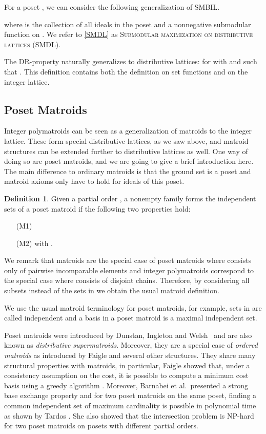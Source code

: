 \documentclass{article}
\theoremstyle{plain}
\theoremstyle{definition}
\newtheorem{defn}[theorem]{Definition}
\begin{document}
For a poset , we can consider the following generalization of SMBIL.
 
 where
  is the collection of all ideals in the poset  and  a nonnegative submodular function on .
 We refer to \eqref{SMDL} as \textsc{Submodular maximization on distributive lattices (SMDL)}.



The DR-property naturally generalizes to distributive lattices: 
 for  with  and  such that . 
This definition contains both the definition on set functions and on the integer lattice. 



 \subsection{Poset Matroids}
Integer polymatroids can be seen as a generalization of matroids to the integer lattice. 
These form special distributive lattices, as we saw above, and matroid structures can be extended further to distributive lattices as well. 
One way of doing so are poset matroids, and we are going to give a brief introduction here.
The main difference to ordinary matroids is that the ground set is a poset and matroid axioms only have to hold for ideals of this poset.
 \begin{defn}
 Given a partial order , a nonempty family  forms the independent sets of a poset matroid 
 if the following two properties hold:
 
 \begin{itemize}
\setlength{\itemindent}{1em}
  \item[(M1)] 
\item[(M2)]  with .
\end{itemize}
 \end{defn}
 
We remark that matroids are the special case of poset matroids where  consists only of pairwise incomparable elements and 
integer polymatroids correspond to the special case where  consists of disjoint chains. 
Therefore, by considering all subsets instead of the sets in  we obtain the usual matroid definition.

We use the usual matroid terminology for poset matroids, for example, sets in  are called independent and 
a basis in a poset matroid is a maximal independent set.

Poset matroids were introduced by Dunstan, Ingleton and Welsh~\cite{DIW1972} and are also known as \emph{distributive supermatroids}. 
Moreover, they are a special case of \emph{ordered matroids} as introduced by Faigle \cite{Faigle1984} and several other structures.
They share many structural properties with matroids, in particular, Faigle showed that, under a consistency assumption on the cost, 
it is possible to compute a minimum cost basis using a greedy algorithm \cite{Faigle1984}. 
Moreover, Barnabei et al.\ presented a strong base exchange property \cite{BarnabeiSymmExchange} and for two poset matroids on the same poset, 
finding a  common independent set of maximum cardinality is possible in polynomial time as shown by Tardos \cite{TardosPosetIntersection}. 
She also showed that the intersection problem is NP-hard for two poset matroids on posets with different partial orders.  
\end{document}

